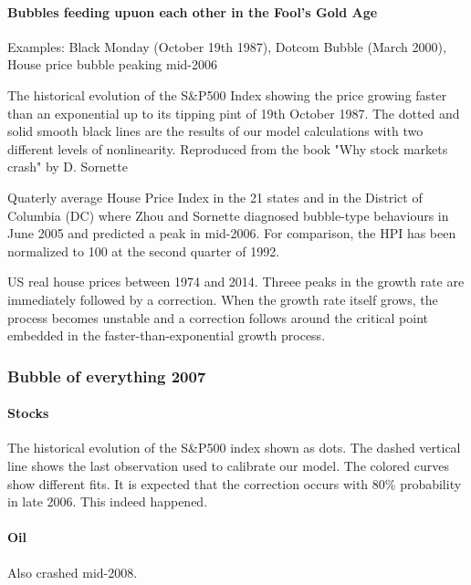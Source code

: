 \paragraph{Bubbles feeding upuon each other in the Fool's Gold Age}

Examples: Black Monday (October 19th 1987), Dotcom Bubble (March 2000),
House price bubble peaking mid-2006

\vspace{1\baselineskip}

The historical evolution of the S\&P500 Index showing the price growing faster
than an exponential up to its tipping pint of 19th October 1987. The dotted
and solid smooth black lines are the results of our model calculations with
two different levels of nonlinearity. Reproduced from the book "Why stock
markets crash" by D. Sornette

\vspace{1\baselineskip}

Quaterly average House Price Index in the 21 states and in the District
of Columbia (DC) where Zhou and Sornette diagnosed bubble-type behaviours in
June 2005 and predicted a peak in mid-2006. For comparison, the HPI has
been normalized to 100 at the second quarter of 1992.

\vspace{1\baselineskip}

US real house prices between 1974 and 2014. Threee peaks in the growth
rate are immediately followed by a correction. When the growth rate itself
grows, the process becomes unstable and a correction follows around the
critical point embedded in the faster-than-exponential growth process.

\subsubsection{Bubble of everything 2007}

\paragraph{Stocks}
The historical evolution of the S\&P500 index shown as dots. The
dashed vertical line shows the last observation used to calibrate our model.
The colored curves show different fits. It is expected that the correction
occurs with 80\% probability in late 2006. This indeed happened.

\paragraph{Oil}
Also crashed mid-2008.

